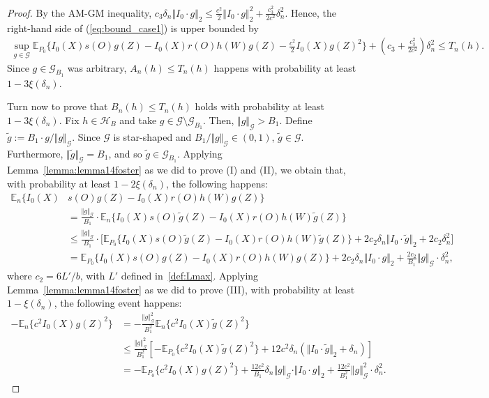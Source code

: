 \documentclass[twoside,11pt]{article}
\newcommand{\E}{\mathbb{E}}
\newcommand{\mc}{\mathcal}
\begin{document}
\begin{proof}
By the AM-GM inequality, $c_3\delta_n\Vert I_0\cdot g\Vert_2\le \frac{c^2}{2}\Vert I_0\cdot g\Vert_2^2+\frac{c_3^2}{2c^2}\delta_n^2$. Hence, the right-hand side of (\ref{eq:bound_case1}) is upper bounded by
\begin{align*}
    \sup_{g\in\mc{G}}\E_{P_0}\Big\{I_0(X)s(O)g(Z)-I_0(X)r(O)h(W)g(Z)-\frac{c^2}{2} I_0(X)g(Z)^2\Big\}+\left(c_3+\frac{c^2_3}{2c^2}\right)\delta_n^2\le T_n(h).
\end{align*}
Since $g\in\mc{G}_{B_1}$ was arbitrary, $A_n(h)\le T_n(h)$ happens with probability at least $1-3\xi(\delta_n)$.

Turn now to prove that $B_n(h)\le T_n(h)$ holds with probability at least $1-3\xi(\delta_n)$. Fix $h\in\mc{H}_B$ and take $g\in\mc{G}\setminus\mc{G}_{B_1}$. Then, $\Vert g\Vert_{\mc{G}}>B_1$. Define $\tilde g:=B_1\cdot  g/\Vert g\Vert_{\mc{G}}$. Since $\mc{G}$ is star-shaped and $B_1/\Vert g\Vert_{\mc{G}}\in(0,1)$, $\tilde g\in\mc{G}$. Furthermore, $\Vert\tilde g\Vert_{\mc{G}}=B_1$, and so $\tilde g\in\mc{G}_{B_1}$. Applying Lemma~\ref{lemma:lemma14foster} as we did to prove (I) and (II), we obtain that, with probability at least $1-2\xi(\delta_n)$,  the following happens:
\begin{align*}
 \E_n\big\{I_0(X)&s(O)g(Z)-I_0(X)r(O)h(W)g(Z)\big\}\\
    &=\frac{\Vert g\Vert_\mc{G}}{B_1}\cdot \E_n\big\{I_0(X)s(O)\tilde g(Z)-I_0(X)r(O)h(W)\tilde g(Z)\big\}\\
    &\le \frac{\Vert g\Vert_\mc{G}}{B_1}\cdot \big[\E_{P_0}\big\{I_0(X)s(O)\tilde g(Z)-I_0(X)r(O)h(W)\tilde g(Z)\big\}+2c_2\delta_n\Vert I_0\cdot \tilde g\Vert_2+2c_2\delta_n^2\big]\\
    &=\E_{P_0}\big\{I_0(X)s(O)g(Z)-I_0(X)r(O)h(W)g(Z)\big\}+2c_2\delta_n\Vert I_0\cdot g\Vert_2+\frac{2c_2}{B_1}\Vert g\Vert_\mc{G}\cdot\delta_n^2,
\end{align*}
where $c_2=6L'/b$, with $L'$ defined in~\eqref{def:Lmax}. Applying Lemma~\ref{lemma:lemma14foster} as we did to prove (III), with probability at least $1-\xi(\delta_n)$, the following event happens:
\begin{align*}
    - \E_n\big\{c^2 I_0(X) g(Z)^2\big\}&=-\frac{\Vert g\Vert_\mc{G}^2}{B_1^2} \E_n\big\{c^2 I_0(X)\tilde g(Z)^2\big\}\\
    &\le \frac{\Vert g\Vert_\mc{G}^2}{B_1^2} \left[-\E_{P_0}\big\{c^2I_0(X)\tilde g(Z)^2\big\}+12c^2\delta_n\left(\Vert I_0\cdot \tilde g\Vert_2+\delta_n\right)\right]\\
    &=-\E_{P_0}\big\{c^2 I_0(X) g(Z)^2\big\}+\frac{12c^2}{B_1}\delta_n\Vert g\Vert_\mc{G}\cdot \Vert I_0\cdot  g\Vert_2+\frac{12c^2}{ B_1^2}\Vert g\Vert_\mc{G}^2\cdot\delta_n^2.
\end{align*}


\end{proof}
\end{document}
